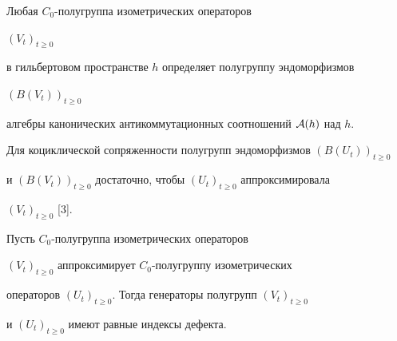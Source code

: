 \begin{note}


Любая $C_0$-полугруппа изометрических операторов


$(V_t)_{t\geq 0}$


в гильбертовом пространстве $h$ определяет полугруппу эндоморфизмов


$(B(V_t))_{t\geq 0}$


алгебры канонических антикоммутационных соотношений ${\cal A}(h)$ над $h$.


Для коциклической сопряженности полугрупп эндоморфизмов $(B(U_t))_{t\geq 0}$


и $(B(V_t))_{t\geq 0}$ достаточно, чтобы $(U_t)_{t\geq 0}$ аппроксимировала


$(V_t)_{t\geq 0}$ [3].


\end{note}





\begin{prop}


Пусть $C_0$-полугруппа изометрических операторов


$(V_t)_{t\geq 0}$ аппроксимирует $C_0$-полугруппу изометрических


операторов $(U_t)_{t\geq 0}$. Тогда генераторы полугрупп $(V_t)_{t\geq 0}$


и $(U_t)_{t\geq 0}$ имеют равные индексы дефекта.


\end{prop}





